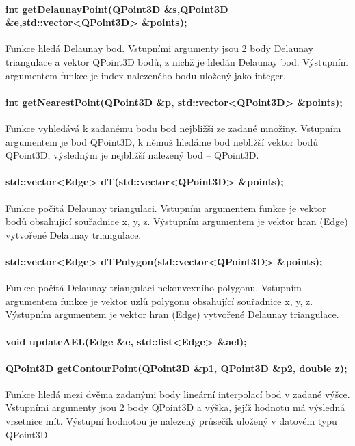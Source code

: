 \documentclass[11pt]{article}
\begin{document}
\paragraph {int getDelaunayPoint(QPoint3D \&s,QPoint3D \&e,std::vector<QPoint3D> \&points);}
Funkce hledá Delaunay bod. Vstupními argumenty jsou 2 body Delaunay triangulace a vektor QPoint3D bodů, z nichž je hledán Delaunay bod. Výstupním argumentem funkce je index nalezeného bodu uložený jako integer.

\paragraph {int getNearestPoint(QPoint3D \&p, std::vector<QPoint3D> \&points);}
Fun\-kce vyhledává k zadanému bodu bod nejbližší ze zadané množiny. Vstupním argumentem je bod QPoint3D, k němuž hledáme bod nebližší vektor bodů QPoint3D, výsledným je nejbližší nalezený bod – QPoint3D.

\paragraph{std::vector<Edge> dT(std::vector<QPoint3D> \&points);}
Funkce počítá De\-launay triangulaci. Vstupním argumentem funkce je vektor bodů obsahující souřadnice x, y, z. Výstupním argumentem je vektor hran (Edge) vytvořené 
Delaunay triangulace.

\paragraph {std::vector<Edge> dTPolygon(std::vector<QPoint3D> \&points);}
Funkce počítá Delaunay triangulaci nekonvexního polygonu. Vstupním argumentem funkce je vektor uzlů polygonu obsahující souřadnice x, y, z. Výstupním argumentem je vektor hran (Edge) vytvořené Delaunay triangulace.

\paragraph {void updateAEL(Edge \&e, std::list<Edge> \&ael);}

\paragraph {QPoint3D getContourPoint(QPoint3D \&p1, QPoint3D \&p2, double z);}
Funkce hledá mezi dvěma zadanými body lineární interpolací bod v zadané výšce. Vstupními argumenty jsou 2 body QPoint3D a výška, jejíž hodnotu má výsledná vrsetnice mít. Výstupní hodnotou je nalezený průsečík uložený v datovém typu QPoint3D.
\end{document}
